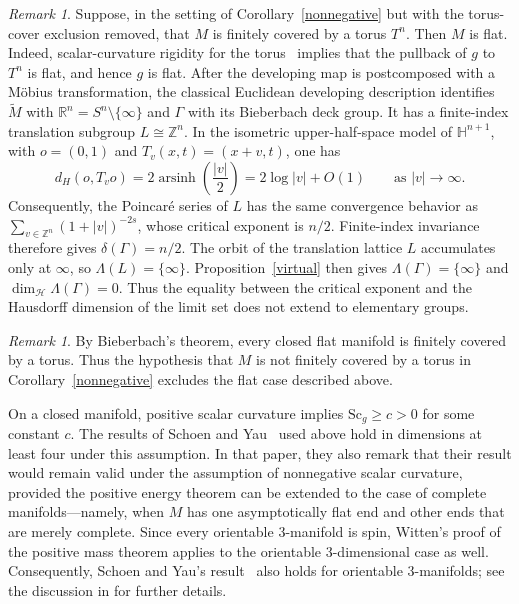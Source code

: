\documentclass[12pt,oneside,a4paper]{article}
\theoremstyle{mytheorem}
\theoremstyle{remark}
\newtheorem{remark}[definition]{Remark}
\theoremstyle{definition}
\begin{document}
\begin{remark}
Suppose, in the setting of Corollary~\ref{nonnegative} but with the
torus-cover exclusion removed, that $M$ is finitely covered by a torus $T^n$.
Then $M$ is flat. Indeed, scalar-curvature rigidity for the
torus~\cite{MR720933} implies that the pullback of $g$ to $T^n$ is flat, and
hence $g$ is flat. After the developing map is postcomposed with a M\"obius
transformation, the classical Euclidean developing description identifies
$\widetilde M$ with $\mathbb R^n=S^n\setminus\{\infty\}$ and $\Gamma$ with
its Bieberbach deck group. It has a finite-index translation subgroup
$L\cong\mathbb Z^n$. In the isometric upper-half-space model of
$\mathbb H^{n+1}$, with $o=(0,1)$ and $T_v(x,t)=(x+v,t)$, one has
\[
d_H(o,T_vo)=2\operatorname{arsinh}\!\left(\frac{|v|}{2}\right)
=2\log|v|+O(1)
\qquad\text{as }|v|\to\infty.
\]
Consequently, the Poincar\'e series of $L$ has the same convergence behavior
as $\sum_{v\in\mathbb Z^n}(1+|v|)^{-2s}$,
whose critical exponent is $n/2$. Finite-index invariance therefore gives
$\delta(\Gamma)=n/2$. The orbit of the translation lattice $L$ accumulates
only at $\infty$, so $\Lambda(L)=\{\infty\}$. Proposition~\ref{virtual}
then gives
$\Lambda(\Gamma)=\{\infty\}$ and $\dim_{\mathcal H}\Lambda(\Gamma)=0$.
Thus the equality between the critical exponent and the Hausdorff dimension
of the limit set does not extend to elementary groups.
\end{remark}



\begin{remark}
By Bieberbach's theorem, every closed flat manifold is finitely covered by a
torus. Thus the hypothesis that \(M\) is not finitely covered by a torus in
Corollary~\ref{nonnegative} excludes the flat case described above.
\end{remark}



On a closed manifold, positive scalar curvature implies
$\mathrm{Sc}_g\geq c>0$ for some constant $c$. The results of Schoen and
Yau~\cite{zbMATH04075988} used above hold in dimensions at least four
under this assumption. In that paper, they also remark that their result
\cite[Proposition 4.4$^{\prime}$]{zbMATH04075988} would remain valid under the
assumption of nonnegative scalar curvature, provided the positive energy
theorem can be extended to the case of complete manifolds---namely, when
\(M\) has one asymptotically flat end and other ends that are merely complete.
Since every orientable \(3\)-manifold is spin, Witten's proof of the positive
mass theorem applies to the orientable \(3\)-dimensional case as well.
Consequently, Schoen and Yau's result~\cite{zbMATH04075988} also holds for
orientable \(3\)-manifolds; see the discussion in
\cite[Appendix~A, p.~805]{zbMATH05042496} for further details.
\end{document}
